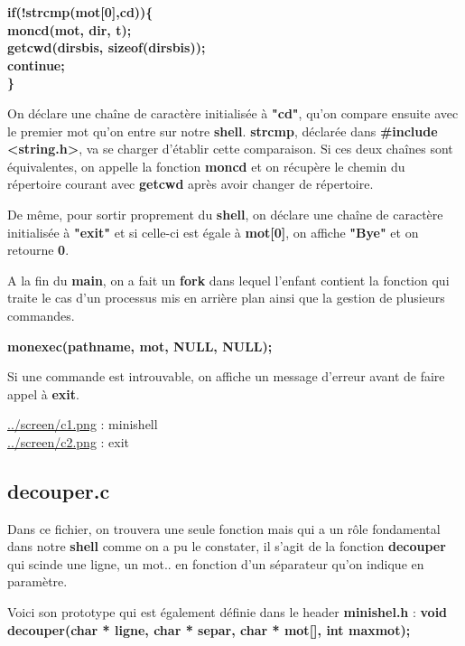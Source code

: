 \documentclass[11pt,a4paper]{report}
\begin{document}
\textbf{if(!strcmp(mot[0],cd))\{\\
	moncd(mot, dir, t);\\
	getcwd(dirsbis, sizeof(dirsbis));\\
	continue;\\
\}}\newline

On déclare une chaîne de caractère initialisée à \textbf{"cd"},
qu'on compare ensuite avec le premier mot qu'on entre sur notre \textbf{shell}. \textbf{strcmp}, déclarée dans \textbf{#include <string.h>}, va se charger d'établir cette comparaison. Si ces deux chaînes sont équivalentes, on appelle la fonction \textbf{moncd} et on récupère le chemin du répertoire courant  avec \textbf{getcwd} après avoir changer de répertoire.\newline

De même, pour sortir proprement du \textbf{shell}, on déclare une chaîne de caractère initialisée à \textbf{"exit"} et si celle-ci est égale à \textbf{mot[0]}, on affiche \textbf{"Bye"}  et on retourne \textbf{0}.\newline

A la fin du \textbf{main}, on a fait un \textbf{fork} dans lequel l'enfant contient la fonction qui traite le cas d'un processus mis en arrière plan ainsi que la gestion de plusieurs commandes.\newline

\textbf{monexec(pathname, mot, NULL, NULL);}\newline

Si une commande est introuvable, on affiche un message d'erreur avant de faire appel à \textbf{exit}.\newline

\href{../screen/c1.png}{../screen/c1.png} : minishell\\
\href{../screen/c2.png}{../screen/c2.png} : exit

\newpage
\subsection{decouper.c\\}

Dans ce fichier, on trouvera une seule fonction mais qui a un rôle fondamental dans notre \textbf{shell} comme on a pu le constater, il s'agit de la fonction \textbf{decouper} qui scinde une ligne, un mot.. en fonction d'un séparateur qu'on indique en paramètre.

Voici son prototype qui est également définie dans le header \textbf{minishel.h} : \newline
\textbf{void decouper(char * ligne, char * separ, char * mot[], int maxmot);}\newline
\end{document}
